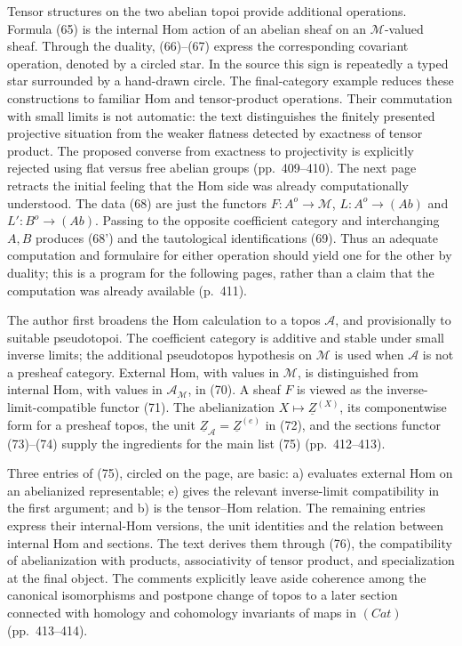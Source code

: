 Tensor structures on the two abelian topoi provide additional operations. Formula (65) is the internal Hom action of an abelian sheaf on an $\mathcal M$-valued sheaf. Through the duality, (66)--(67) express the corresponding covariant operation, denoted by a circled star. In the source this sign is repeatedly a typed star surrounded by a hand-drawn circle. The final-category example reduces these constructions to familiar Hom and tensor-product operations. Their commutation with small limits is not automatic: the text distinguishes the finitely presented projective situation from the weaker flatness detected by exactness of tensor product. The proposed converse from exactness to projectivity is explicitly rejected using flat versus free abelian groups (pp.\ 409--410). The next page retracts the initial feeling that the Hom side was already computationally understood. The data (68) are just the functors $F:A^o\to\mathcal M$, $L:A^o\to(Ab)$ and $L':B^o\to(Ab)$. Passing to the opposite coefficient category and interchanging $A,B$ produces (68') and the tautological identifications (69). Thus an adequate computation and formulaire for either operation should yield one for the other by duality; this is a program for the following pages, rather than a claim that the computation was already available (p.\ 411).

The author first broadens the Hom calculation to a topos $\mathcal A$, and provisionally to suitable pseudotopoi. The coefficient category is additive and stable under small inverse limits; the additional pseudotopos hypothesis on $\mathcal M$ is used when $\mathcal A$ is not a presheaf category. External Hom, with values in $\mathcal M$, is distinguished from internal Hom, with values in $\mathcal A_{\mathcal M}$, in (70). A sheaf $F$ is viewed as the inverse-limit-compatible functor (71). The abelianization $X\mapsto\underline Z^{(X)}$, its componentwise form for a presheaf topos, the unit $\underline Z_{\mathcal A}=\underline Z^{(e)}$ in (72), and the sections functor (73)--(74) supply the ingredients for the main list (75) (pp.\ 412--413).

Three entries of (75), circled on the page, are basic: a) evaluates external Hom on an abelianized representable; e) gives the relevant inverse-limit compatibility in the first argument; and b) is the tensor--Hom relation. The remaining entries express their internal-Hom versions, the unit identities and the relation between internal Hom and sections. The text derives them through (76), the compatibility of abelianization with products, associativity of tensor product, and specialization at the final object. The comments explicitly leave aside coherence among the canonical isomorphisms and postpone change of topos to a later section connected with homology and cohomology invariants of maps in $(Cat)$ (pp.\ 413--414).

